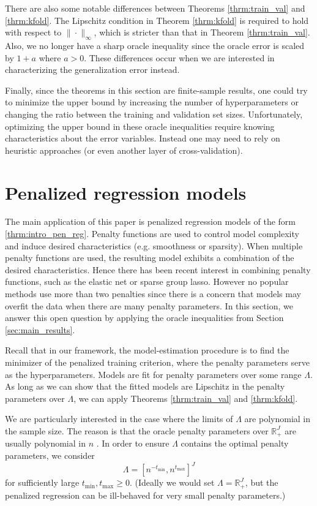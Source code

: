 \documentclass[12pt]{article}
\begin{document}
There are also some notable differences between Theorems \ref{thrm:train_val} and \ref{thrm:kfold}. The Lipschitz condition in Theorem \ref{thrm:kfold} is required to hold with respect to $\| \cdot \|_\infty$, which is stricter than that in Theorem \ref{thrm:train_val}. Also, we no longer have a sharp oracle inequality since the oracle error is scaled by $1+a$ where $a > 0$. These differences occur when we are interested in characterizing the generalization error instead.

Finally, since the theorems in this section are finite-sample results, one could try to minimize the upper bound by increasing the number of hyperparameters or changing the ratio between the training and validation set sizes. Unfortunately, optimizing the upper bound in these oracle inequalities require knowing characteristics about the error variables. Instead one may need to rely on heuristic approaches (or even another layer of cross-validation).

\section{Penalized regression models}
\label{sec:examples}

The main application of this paper is penalized regression models of the form \eqref{thrm:intro_pen_reg}. Penalty functions are used to control model complexity and induce desired characteristics (e.g. smoothness or sparsity). When multiple penalty functions are used, the resulting model exhibits a combination of the desired characteristics. Hence there has been recent interest in combining penalty functions, such as the elastic net or sparse group lasso. However no popular methods use more than two penalties since there is a concern that models may overfit the data when there are many penalty parameters. In this section, we answer this open question by applying the oracle inequalities from Section \ref{sec:main_results}.

Recall that in our framework, the model-estimation procedure is to find the minimizer of the penalized training criterion, where the penalty parameters serve as the hyperparameters. Models are fit for penalty parameters over some range $\Lambda$. As long as we can show that the fitted models are Lipschitz in the penalty parameters over $\Lambda$, we can apply Theorems \ref{thrm:train_val} and \ref{thrm:kfold}.

We are particularly interested in the case where the limits of $\Lambda$ are polynomial in the sample size. The reason is that the oracle penalty parameters over $\mathbb{R}^J_+$ are usually polynomial in $n$ \citep{van2000empirical, van2014additive, buhlmann2011statistics}. In order to ensure $\Lambda$ contains the optimal penalty parameters, we consider
\begin{equation}
\label{thrm:lambda_range}
\Lambda = [ n^{-t_{\min}}, n^{t_{\max}}]^J
\end{equation}
for sufficiently large $t_{\min}, t_{\max} \ge 0$. (Ideally we would set $\Lambda = \mathbb{R}^J_+$, but the penalized regression can be ill-behaved for very small penalty parameters.)
\end{document}
